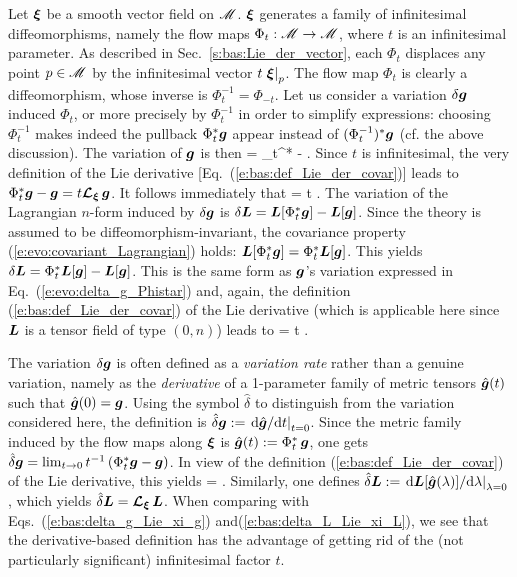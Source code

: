 Let $\bm{\xi}$ be a smooth vector field on $\mathscr{M}$. $\bm{\xi}$ generates a family of
infinitesimal diffeomorphisms, namely the flow maps $\Phi_t: \mathscr{M} \to \mathscr{M}$, where
$t$ is an infinitesimal parameter. As described in Sec.~\ref{s:bas:Lie_der_vector}, each $\Phi_t$ displaces any point $p\in\mathscr{M}$ by the infinitesimal vector $t\left.\bm{\xi}\right| _p$.
The flow map $\Phi_t$ is clearly a diffeomorphism, whose inverse is $\Phi_t^{-1} = \Phi_{-t}$.
Let us consider a variation $\delta\bm{g}$ induced $\Phi_t$,
or more precisely by $\Phi_t^{-1}$ in order to simplify expressions:
choosing $\Phi_t^{-1}$ makes indeed the pullback $\Phi_t^*\bm{g}$ appear instead of $(\Phi_t^{-1})^*\bm{g}$
(cf. the above discussion). The variation of $\bm{g}$ is then
\be \label{e:evo:delta_g_Phistar}
    \delta{} = \Phi_t^*  -  .
\ee
Since $t$ is infinitesimal, the very definition of the
Lie derivative [Eq.~(\ref{e:bas:def_Lie_der_covar})] leads to
$\Phi_t^*\bm{g} - \bm{g} = t \bm{\mathcal{L}}_{\bm{\xi}}\, \bm{g}$.
It follows immediately that
\be  \label{e:bas:delta_g_Lie_xi_g}
    \delta{} = t \Lie{\xi}  .
\ee
The variation of the Lagrangian $n$-form induced by $\delta\bm{g}$
is $\delta\bm{L} = \bm{L}[\Phi_t^*\bm{g}] - \bm{L}[\bm{g}]$.
Since the theory is assumed to be diffeomorphism-invariant, the covariance property
(\ref{e:evo:covariant_Lagrangian}) holds: $\bm{L}[\Phi_t^*\bm{g}] = \Phi_t^*\bm{L}[\bm{g}]$.
This yields $\delta\bm{L} = \Phi_t^* \bm{L}[\bm{g}] - \bm{L}[\bm{g}]$. This
is the same form as $\bm{g}$'s variation expressed in Eq.~(\ref{e:evo:delta_g_Phistar}) and, again, the
definition (\ref{e:bas:def_Lie_der_covar}) of the Lie derivative (which is applicable here since
$\bm{L}$ is a tensor field of type $(0,n)$) leads to
\be \label{e:bas:delta_L_Lie_xi_L}
    \delta{} = t \Lie{\xi}  .
\ee

\begin{remark}
The variation $\delta\bm{g}$ is often defined as a \emph{variation rate} rather than a genuine variation, namely
as the \emph{derivative} of a 1-parameter family of metric tensors $\hat{\bm{g}}(t)$ such that
$\hat{\bm{g}}(0) = \bm{g}$. Using the symbol $\hat\delta$ to distinguish from the variation considered here,
the definition is
$\hat{\delta}\bm{g} := \left. \mathrm{d}{\hat{\bm{g}}}/\mathrm{d}{t} \right|_{t=0}$.
Since the metric family induced by the flow maps along $\bm{\xi}$ is
$\hat{\bm{g}}(t) := \Phi_t^*\, \bm{g}$, one gets
$\hat{\delta}\bm{g} = \lim_{t\to 0} t^{-1} \left( \Phi_t^* \bm{g} - \bm{g} \right)$.
In view of the definition (\ref{e:bas:def_Lie_der_covar}) of the Lie derivative, this yields
\be \label{e:evo:hat_delta_g_Lie}
    \hat{\delta} =  \Lie{\xi}  .
\ee
Similarly, one defines $\hat{\delta}\bm{L} :=  \left. \mathrm{d}{\bm{L}[\hat{\bm{g}}(\lambda)]}/\mathrm{d}{\lambda} \right|_{\lambda=0}$, which yields $\hat{\delta}\bm{L} =  \bm{\mathcal{L}}_{\bm{\xi}}\, \bm{L}$.
When comparing with Eqs.~(\ref{e:bas:delta_g_Lie_xi_g}) and(\ref{e:bas:delta_L_Lie_xi_L}), we see that the derivative-based definition has the advantage of getting rid of the (not particularly significant) infinitesimal factor $t$.
\end{remark}

